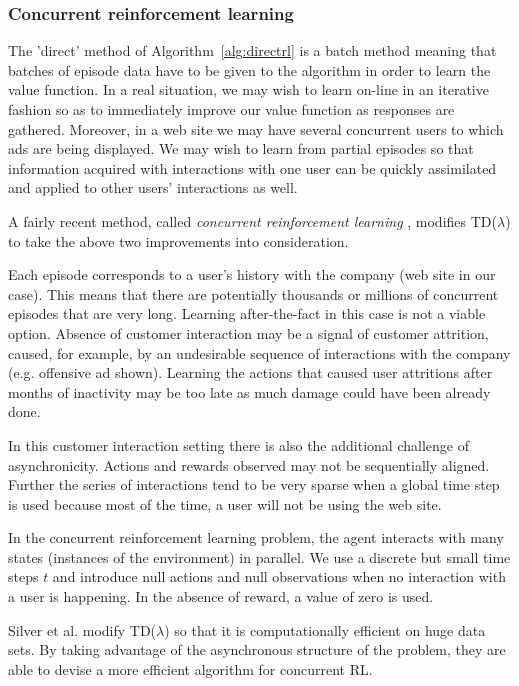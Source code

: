 \documentclass{article} %
\begin{document}
\subsubsection{Concurrent reinforcement learning}
The 'direct' method of Algorithm~\ref{alg:directrl} is a batch method meaning
that batches of episode data have to be given to the algorithm in order to
learn the value function. In a real situation, we may wish to learn on-line in
an iterative fashion so as to immediately improve our value function as
responses are gathered. Moreover, in a web site we may have several concurrent
users to which ads are being displayed. We may wish to learn from partial
episodes so that information acquired with interactions with one user can be
quickly assimilated and applied to other users' interactions as well.

A fairly recent method, called \emph{concurrent reinforcement learning}
\cite{silver2013concurrent}, modifies TD($\lambda$) to take the above two
improvements into consideration.

Each episode corresponds to a user's history with the company (web site in our
case). This means that there are potentially thousands or millions of
concurrent episodes that are very long. Learning after-the-fact in this case is
not a viable option. Absence of customer interaction may be a signal of
customer attrition, caused, for example, by an undesirable sequence of
interactions with the company (e.g. offensive ad shown). Learning the actions
that caused user attritions after months of inactivity may be too late as
much damage could have been already done.

In this customer interaction setting there is also the additional challenge of
asynchronicity. Actions and rewards observed may not be sequentially aligned.
Further the series of interactions tend to be very sparse when a global time
step is used because most of the time, a user will not be using the web
site.

In the concurrent reinforcement learning problem, the agent interacts with many
states (instances of the environment) in parallel. We use a discrete but small
time steps $t$ and introduce null actions and null observations when no
interaction with a user is happening. In the absence of reward, a value of zero
is used.

Silver et al. \cite{silver2013concurrent} modify TD($\lambda$) so that it is
computationally efficient on huge data sets. By taking advantage of the
asynchronous structure of the problem, they are able to devise a more efficient
algorithm for concurrent RL.
\end{document}
